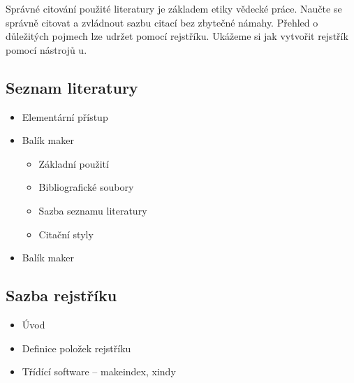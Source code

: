 {
	Správné citování použité literatury je základem etiky vědecké práce. Naučte se správně citovat a zvládnout sazbu citací bez zbytečné námahy. Přehled o důležitých pojmech lze udržet pomocí rejstříku. Ukážeme si jak vytvořit rejstřík pomocí nástrojů u.
	\subsection*{Seznam literatury}
	\begin{itemize}
		\item Elementární přístup
		\item Balík maker \BibLaTeXLogo
			\begin{itemize}
				\item Základní použití
				\item Bibliografické soubory
				\item Sazba seznamu literatury
				\item Citační styly
			\end{itemize}
		\item Balík maker 
	\end{itemize}
	\subsection*{Sazba rejstříku}
	\begin{itemize}
		\item Úvod
		\item Definice položek rejstříku
		\item Třídící software -- makeindex, xindy
	\end{itemize}
}
\endinput
